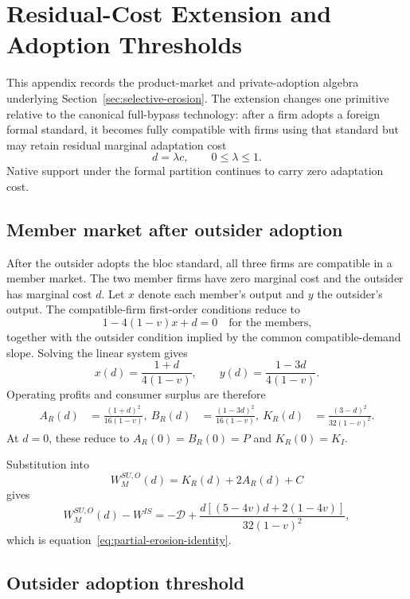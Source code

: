 \section{Residual-Cost Extension and Adoption Thresholds}
\label{app:partial-erosion}

This appendix records the product-market and private-adoption algebra underlying Section~\ref{sec:selective-erosion}. The extension changes one primitive relative to the canonical full-bypass technology: after a firm adopts a foreign formal standard, it becomes fully compatible with firms using that standard but may retain residual marginal adaptation cost
\[
d=\lambda c,
\qquad
0\leq\lambda\leq1.
\]
Native support under the formal partition continues to carry zero adaptation cost.

\subsection{Member market after outsider adoption}

After the outsider adopts the bloc standard, all three firms are compatible in a member market. The two member firms have zero marginal cost and the outsider has marginal cost $d$. Let $x$ denote each member's output and $y$ the outsider's output. The compatible-firm first-order conditions reduce to
\[
1-4(1-v)x+d=0
\quad\text{for the members,}
\]
together with the outsider condition implied by the common compatible-demand slope. Solving the linear system gives
\begin{equation}
x(d)=\frac{1+d}{4(1-v)},
\qquad
y(d)=\frac{1-3d}{4(1-v)}.
\label{eq:appendix-partial-quantities}
\end{equation}
Operating profits and consumer surplus are therefore
\begin{align}
A_R(d)&=\frac{(1+d)^2}{16(1-v)},\
B_R(d)&=\frac{(1-3d)^2}{16(1-v)},\
K_R(d)&=\frac{(3-d)^2}{32(1-v)^2}.
\label{eq:appendix-partial-blocks}
\end{align}
At $d=0$, these reduce to $A_R(0)=B_R(0)=P$ and $K_R(0)=K_I$.

Substitution into
\[
W_M^{SU,O}(d)=K_R(d)+2A_R(d)+C
\]
gives
\begin{equation}
W_M^{SU,O}(d)-W^{IS}
=
-\mathscr D+
\frac{d[(5-4v)d+2(1-4v)]}{32(1-v)^2},
\label{eq:appendix-residual-identity}
\end{equation}
which is equation~\eqref{eq:partial-erosion-identity}.

\subsection{Outsider adoption threshold}

